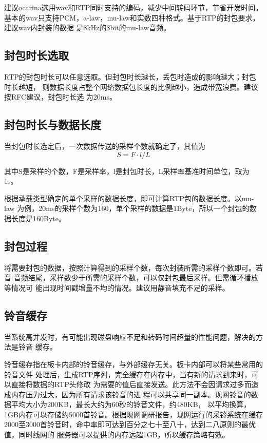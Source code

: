 \documentclass[11pt]{article}
\begin{document}
    建议ocarina选用wav和RTP同时支持的编码，减少中间转码环节，节省开发时间。
基本的wav只支持PCM，a-law，mu-law和实数四种格式。基于RTP的封包要求，建议wav内封装的数据
是8kHz的8bit的mu-law音频。
\subsection{封包时长选取}
   RTP的封包时长可以任意选取。但封包时长越长，丢包时造成的影响越大；封包时长越短，
则数据长度占整个网络数据包长度的比例越小，造成带宽浪费。建议按RFC建议，封包时长选
为20ms。
\subsection{封包时长与数据长度}
   当封包时长选定后，一次数据传送的采样个数就确定了，其值为$$S = F \cdot l/L$$

   其中S是采样的个数，F是采样率，l是封包时长，L采样率基准时间单位，取为1s。

   根据承载类型确定的单个采样的数据长度，即可计算RTP包的数据长度。以mu-law
为例，20ms的采样个数为160，单个采样的数据是1Byte，所以一个封包的数据长度是160Byte。
\subsection{封包过程}
   将需要封包的数据，按照计算得到的采样个数，每次封装所需的采样个数即可。若音
音频结尾，采样数少于所需的采样个数，可以仅封包最后采样。但需循环播放等情况可
能出现时间戳增量不均的情况。建议用静音填充不足的采样。

\subsection{铃音缓存}
    当系统高并发时，有可能出现磁盘响应不足和转码时间超量的性能问题，解决的方法是铃音
缓存。

    铃音缓存指在板卡内部的铃音缓存，与外部缓存无关。板卡内部可以将某些常用的铃音文件
处理后，生成RTP序列，完全缓存在内存中，当有新的请求到来时，可以直接将数据的RTP头修改
为需要的值后直接发送。此方法不会因请求过多而造成内存压力过大，因为所有请求该铃音的进
程可以共享同一副本。现网铃音的数据平均大小为200KB，最长大约为60秒的铃音文件，约480KB，
以平均换算，1GB内存可以存储约5000首铃音。根据现网调研报告，现网运行的采铃系统在缓存
2000至3000首铃音时，命中率即可达到百分之七十至八十，达到二八原则的最优值，同时线网的
服务器可以提供的内存远超1GB，所以缓存策略有效。
\end{document}
